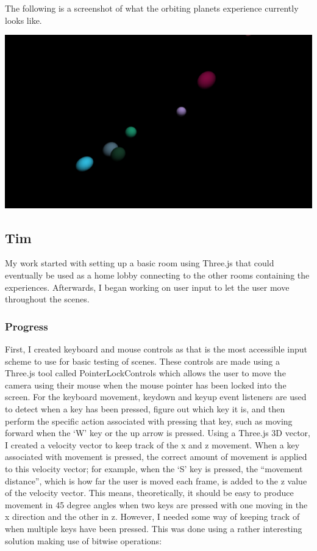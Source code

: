 \documentclass[onecolumn, draftclsnofoot,10pt, compsoc]{IEEEtran}
\begin{document}
The following is a screenshot of what the orbiting planets experience currently looks like.

\includegraphics[width=\linewidth]{images/planets.png}

\subsection{Tim}
My work started with setting up a basic room using Three.js that could eventually be used as a home lobby connecting to the other rooms containing the experiences. Afterwards, I began working on user input to let the user move throughout the scenes. 

\subsubsection{Progress}
First, I created keyboard and mouse controls as that is the most accessible input scheme to use for basic testing of scenes. These controls are made using a Three.js tool called PointerLockControls which allows the user to move the camera using their mouse when the mouse pointer has been locked into the screen. For the keyboard movement, keydown and keyup event listeners are used to detect when a key has been pressed, figure out which key it is, and then perform the specific action associated with pressing that key, such as moving forward when the ‘W’ key or the up arrow is pressed. Using a Three.js 3D vector, I created a velocity vector to keep track of the x and z movement. When a key associated with movement is pressed, the correct amount of movement is applied to this velocity vector; for example, when the ‘S’ key is pressed, the “movement distance”, which is how far the user is moved each frame, is added to the z value of the velocity vector. This means, theoretically, it should be easy to produce movement in 45 degree angles when two keys are pressed with one moving in the x direction and the other in z. However, I needed some way of keeping track of when multiple keys have been pressed. This was done using a rather interesting solution making use of bitwise operations: 
\end{document}

